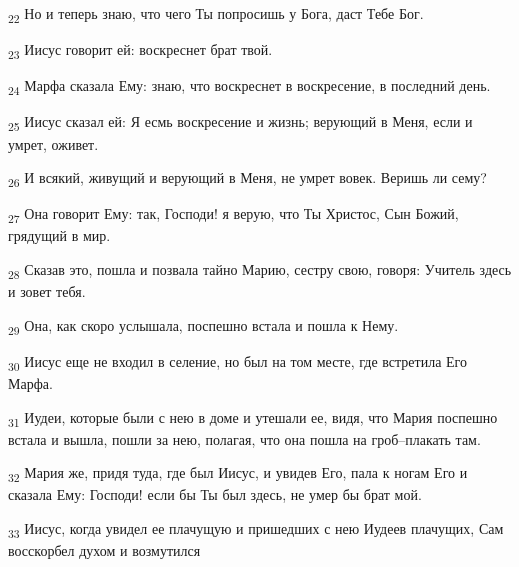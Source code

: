 \begin{tcolorbox}
\textsubscript{22} Но и теперь знаю, что чего Ты попросишь у Бога, даст Тебе Бог.
\end{tcolorbox}
\begin{tcolorbox}
\textsubscript{23} Иисус говорит ей: воскреснет брат твой.
\end{tcolorbox}
\begin{tcolorbox}
\textsubscript{24} Марфа сказала Ему: знаю, что воскреснет в воскресение, в последний день.
\end{tcolorbox}
\begin{tcolorbox}
\textsubscript{25} Иисус сказал ей: Я есмь воскресение и жизнь; верующий в Меня, если и умрет, оживет.
\end{tcolorbox}
\begin{tcolorbox}
\textsubscript{26} И всякий, живущий и верующий в Меня, не умрет вовек. Веришь ли сему?
\end{tcolorbox}
\begin{tcolorbox}
\textsubscript{27} Она говорит Ему: так, Господи! я верую, что Ты Христос, Сын Божий, грядущий в мир.
\end{tcolorbox}
\begin{tcolorbox}
\textsubscript{28} Сказав это, пошла и позвала тайно Марию, сестру свою, говоря: Учитель здесь и зовет тебя.
\end{tcolorbox}
\begin{tcolorbox}
\textsubscript{29} Она, как скоро услышала, поспешно встала и пошла к Нему.
\end{tcolorbox}
\begin{tcolorbox}
\textsubscript{30} Иисус еще не входил в селение, но был на том месте, где встретила Его Марфа.
\end{tcolorbox}
\begin{tcolorbox}
\textsubscript{31} Иудеи, которые были с нею в доме и утешали ее, видя, что Мария поспешно встала и вышла, пошли за нею, полагая, что она пошла на гроб--плакать там.
\end{tcolorbox}
\begin{tcolorbox}
\textsubscript{32} Мария же, придя туда, где был Иисус, и увидев Его, пала к ногам Его и сказала Ему: Господи! если бы Ты был здесь, не умер бы брат мой.
\end{tcolorbox}
\begin{tcolorbox}
\textsubscript{33} Иисус, когда увидел ее плачущую и пришедших с нею Иудеев плачущих, Сам восскорбел духом и возмутился
\end{tcolorbox}
